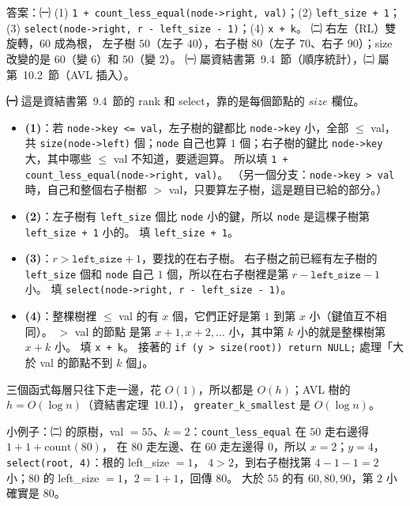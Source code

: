 \begin{pastsoln}
答案：㈠ (1) \texttt{1 + count\_less\_equal(node->right, val)}；(2) \texttt{left\_size + 1}；
(3) \texttt{select(node->right, r - left\_size - 1)}；(4) \texttt{x + k}。 ㈡ 右左（RL）雙旋轉，$60$ 成為根，
左子樹 $50$（左子 $40$），右子樹 $80$（左子 $70$、右子 $90$）；size 改變的是 $60$（變 $6$）和 $50$（變 $2$）。
㈠ 屬資結書第~9.4~節（順序統計），㈡ 屬第~10.2~節（AVL 插入）。

\textbf{㈠} 這是資結書第~9.4~節的 rank 和 select，靠的是每個節點的 $\mathit{size}$ 欄位。
\begin{itemize}
\item \textbf{(1)}：若 \texttt{node->key <= val}，左子樹的鍵都比 \texttt{node->key} 小，全部 $\le$ val，共
\texttt{size(node->left)} 個；\texttt{node} 自己也算 $1$ 個；右子樹的鍵比 \texttt{node->key} 大，其中哪些 $\le$ val
不知道，要遞迴算。 所以填 \texttt{1 + count\_less\_equal(node->right, val)}。 （另一個分支：\texttt{node->key > val}
時，自己和整個右子樹都 $>$ val，只要算左子樹，這是題目已給的部分。）
\item \textbf{(2)}：左子樹有 \texttt{left\_size} 個比 \texttt{node} 小的鍵，所以 \texttt{node} 是這棵子樹第
\texttt{left\_size + 1} 小的。 填 \texttt{left\_size + 1}。
\item \textbf{(3)}：$r > \texttt{left\_size} + 1$，要找的在右子樹。 右子樹之前已經有左子樹的 \texttt{left\_size} 個和
\texttt{node} 自己 $1$ 個，所以在右子樹裡是第 $r - \texttt{left\_size} - 1$ 小。 填
\texttt{select(node->right, r - left\_size - 1)}。
\item \textbf{(4)}：整棵樹裡 $\le$ val 的有 $x$ 個，它們正好是第 $1$ 到第 $x$ 小（鍵值互不相同）。 $>$ val 的節點
是第 $x + 1, x + 2, \ldots$ 小，其中第 $k$ 小的就是整棵樹第 $x + k$ 小。 填 \texttt{x + k}。 接著的
\texttt{if (y > size(root)) return NULL;} 處理「大於 val 的節點不到 $k$ 個」。
\end{itemize}
三個函式每層只往下走一邊，花 $O(1)$，所以都是 $O(h)$；AVL 樹的 $h = O(\log n)$（資結書定理~10.1），
\texttt{greater\_k\_smallest} 是 $O(\log n)$。

小例子：㈡ 的原樹，val $= 55$、$k = 2$：\texttt{count\_less\_equal} 在 $50$ 走右邊得 $1 + 1 + \text{count}(80)$，
在 $80$ 走左邊、在 $60$ 走左邊得 $0$，所以 $x = 2$；$y = 4$，\texttt{select(root, 4)}：根的 left\_size $= 1$，
$4 > 2$，到右子樹找第 $4 - 1 - 1 = 2$ 小；$80$ 的 left\_size $= 1$，$2 = 1 + 1$，回傳 $80$。 大於 $55$ 的有
$60, 80, 90$，第 $2$ 小確實是 $80$。


\end{pastsoln}
